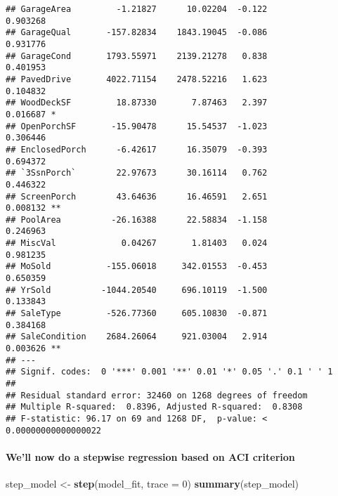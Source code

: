 \documentclass[]{article}
\newenvironment{Shaded}{\begin{snugshade}}{\end{snugshade}}
\newcommand{\DataTypeTok}[1]{\textcolor[rgb]{0.13,0.29,0.53}{#1}}
\newcommand{\DecValTok}[1]{\textcolor[rgb]{0.00,0.00,0.81}{#1}}
\newcommand{\KeywordTok}[1]{\textcolor[rgb]{0.13,0.29,0.53}{\textbf{#1}}}
\newcommand{\NormalTok}[1]{#1}
\newcommand{\StringTok}[1]{\textcolor[rgb]{0.31,0.60,0.02}{#1}}
\let\oldparagraph\paragraph
\renewcommand{\paragraph}[1]{\oldparagraph{#1}\mbox{}}
\begin{document}
\begin{verbatim}
## GarageArea         -1.21827      10.02204  -0.122             0.903268    
## GarageQual       -157.82834    1843.19045  -0.086             0.931776    
## GarageCond       1793.55971    2139.21278   0.838             0.401953    
## PavedDrive       4022.71154    2478.52216   1.623             0.104832    
## WoodDeckSF         18.87330       7.87463   2.397             0.016687 *  
## OpenPorchSF       -15.90478      15.54537  -1.023             0.306446    
## EnclosedPorch      -6.42617      16.35079  -0.393             0.694372    
## `3SsnPorch`        22.97673      30.16114   0.762             0.446322    
## ScreenPorch        43.64636      16.46591   2.651             0.008132 ** 
## PoolArea          -26.16388      22.58834  -1.158             0.246963    
## MiscVal             0.04267       1.81403   0.024             0.981235    
## MoSold           -155.06018     342.01553  -0.453             0.650359    
## YrSold          -1044.20540     696.10119  -1.500             0.133843    
## SaleType         -526.77360     605.10830  -0.871             0.384168    
## SaleCondition    2684.26064     921.03004   2.914             0.003626 ** 
## ---
## Signif. codes:  0 '***' 0.001 '**' 0.01 '*' 0.05 '.' 0.1 ' ' 1
## 
## Residual standard error: 32460 on 1268 degrees of freedom
## Multiple R-squared:  0.8396, Adjusted R-squared:  0.8308 
## F-statistic: 96.17 on 69 and 1268 DF,  p-value: < 0.00000000000000022
\end{verbatim}

\hypertarget{well-now-do-a-stepwise-regression-based-on-aci-criterion}{%
\paragraph{We'll now do a stepwise regression based on ACI
criterion}\label{well-now-do-a-stepwise-regression-based-on-aci-criterion}}

\begin{Shaded}
\begin{Highlighting}[]
\NormalTok{step_model <-}\StringTok{ }\KeywordTok{step}\NormalTok{(model_fit, }\DataTypeTok{trace =} \DecValTok{0}\NormalTok{)}
\KeywordTok{summary}\NormalTok{(step_model)}
\end{Highlighting}
\end{Shaded}
\end{document}
